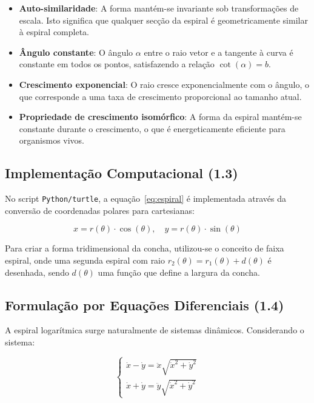 \documentclass[12pt,a4paper,oneside]{extarticle}
\begin{document}
\begin{itemize}
    \item \textbf{Auto-similaridade}: A forma mantém-se invariante sob transformações de escala. Isto significa que qualquer secção da espiral é geometricamente similar à espiral completa.
    
    \item \textbf{Ângulo constante}: O ângulo $\alpha$ entre o raio vetor e a tangente à curva é constante em todos os pontos, satisfazendo a relação $\cot(\alpha) = b$.
    
    \item \textbf{Crescimento exponencial}: O raio cresce exponencialmente com o ângulo, o que corresponde a uma taxa de crescimento proporcional ao tamanho atual.
    
    \item \textbf{Propriedade de crescimento isomórfico}: A forma da espiral mantém-se constante durante o crescimento, o que é energeticamente eficiente para organismos vivos.
\end{itemize}

\subsection{Implementação Computacional (1.3)}
No script \texttt{Python/turtle}, a equação~\ref{eq:espiral} é implementada através da conversão de coordenadas polares para cartesianas:

\begin{equation}
x = r(\theta) \cdot \cos(\theta), \quad y = r(\theta) \cdot \sin(\theta)
\label{eq:cartesianas}
\end{equation}

Para criar a forma tridimensional da concha, utilizou-se o conceito de faixa espiral, onde uma segunda espiral com raio $r_2(\theta) = r_1(\theta) + d(\theta)$ é desenhada, sendo $d(\theta)$ uma função que define a largura da concha.

\subsection{Formulação por Equações Diferenciais (1.4)}
A espiral logarítmica surge naturalmente de sistemas dinâmicos. Considerando o sistema:

\begin{equation}
\begin{cases}
\dot{x} - \dot{y} = \ddot{x}\sqrt{\dot{x}^2 + \dot{y}^2} \\
\dot{x} + \dot{y} = \ddot{y}\sqrt{\dot{x}^2 + \dot{y}^2}
\end{cases}
\label{eq:diferencial}
\end{equation}
\end{document}
